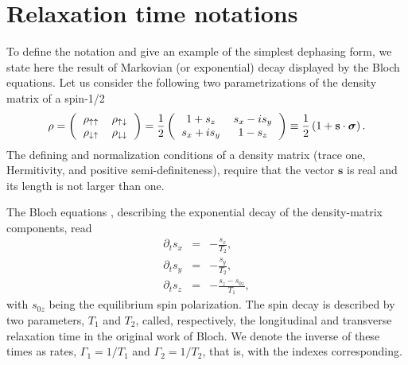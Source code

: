 \documentclass[aps, prx, showpacs, twocolumn, superscriptaddress, notitlepage, longbibliography, floatfix, nofootinbib]{revtex4-2}
\begin{document}
\section{Relaxation time notations}

\label{app:notation}

To define the notation and give an example of the simplest dephasing form, we state here the result of Markovian (or exponential) decay displayed by the Bloch equations. Let us consider the following two parametrizations of the density matrix of a spin-1/2
\begin{equation}
\rho =\left( 
\begin{tabular}{cc}
 $\rho_{\uparrow\uparrow}$ &  $\rho_{\uparrow\downarrow}$\\
  $\rho_{\downarrow\uparrow}$&  $\rho_{\downarrow\downarrow}$
\end{tabular}
\right)
=\frac{1}{2} \left( 
\begin{tabular}{cc}
 $1+s_z$ & $s_x-i s_y$\\
 $s_x+i s_y$&$1-s_z$
\end{tabular}
\right) \equiv \frac{1}{2}\left( 1 + \mathbf{s} \cdot \boldsymbol{\sigma} \right).
\label{eq:densityMatrix}
\end{equation}
The defining and normalization conditions of a density matrix (trace one, Hermitivity, and positive semi-definiteness), require that the vector $\mathbf{s}$ is real and its length is not larger than one.

The Bloch equations \cite{bloch_nuclear_1946}, describing the exponential decay of the density-matrix components, read
\begin{subequations}
\begin{eqnarray}
\partial_t s_x &=&  -\frac{s_x}{T_2},\\
\partial_t s_y &=& -\frac{s_y}{T_2},\\
\partial_t s_z &=& -\frac{s_z-s_{0z}}{T_1},
\end{eqnarray}
\label{eq:Bloch}
\end{subequations}
with
$s_{0z}$ being the equilibrium spin polarization. The spin decay is described by two parameters, $T_1$ and $T_2$, called, respectively, the longitudinal and transverse relaxation time in the original work of Bloch. We denote the inverse of these times as rates, $\Gamma_1=1/T_1$ and $\Gamma_2=1/T_2$, that is, with the indexes corresponding.
\end{document}
